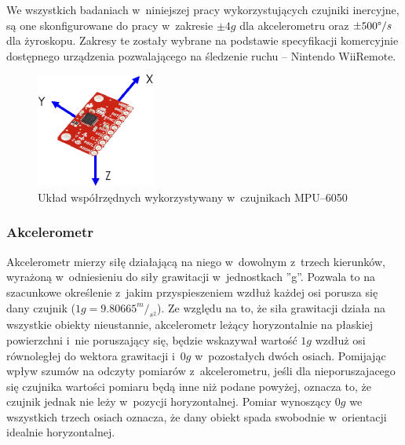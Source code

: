 We wszystkich badaniach w~niniejszej pracy wykorzystujących czujniki inercyjne, są one skonfigurowane do pracy w~zakresie  $\pm4g$ dla akcelerometru oraz $\pm500\degree/s$dla żyroskopu. Zakresy te zostały wybrane na podstawie specyfikacji komercyjnie dostępnego urządzenia pozwalającego na śledzenie ruchu -- Nintendo WiiRemote.
		
\begin{figure}[!htp]
	\centering 
	\includegraphics[width=0.35\textwidth]{images/imuCoordinationSpace.eps}	
	\caption{Układ współrzędnych wykorzystywany w~czujnikach MPU--6050}
	\label{fig:characteristics:imu:space}
\end{figure}
		
		
\subsubsection*{Akcelerometr}
Akcelerometr mierzy siłę działającą na niego w~dowolnym z~trzech kierunków, wyrażoną w~odniesieniu do siły grawitacji w~jednostkach ''g''. Pozwala to na szacunkowe określenie z~jakim przyspieszeniem wzdłuż każdej osi porusza się dany czujnik 
($1g =9.80665^m/_{s^2}$). Ze względu na to, że siła grawitacji działa na wszystkie obiekty nieustannie, akcelerometr leżący horyzontalnie na płaskiej powierzchni i~nie poruszający się, będzie wskazywał wartość $1g$ wzdłuż osi równoległej do wektora grawitacji i~$0g$ w~pozostałych dwóch osiach. Pomijając wpływ szumów na odczyty pomiarów z~akcelerometru, jeśli dla nieporuszajacego się czujnika wartości pomiaru będą inne niż podane powyżej, oznacza to, że czujnik jednak nie leży w~pozycji horyzontalnej. Pomiar wynoszący $0g$ we wszystkich trzech osiach oznacza, że dany obiekt spada swobodnie w~orientacji idealnie horyzontalnej.\\
		
